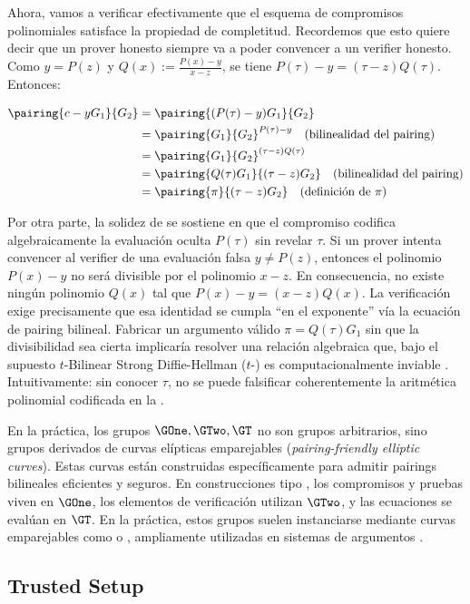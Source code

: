 Ahora, vamos a verificar efectivamente que el esquema de compromisos polinomiales \KZG satisface la propiedad de completitud. Recordemos que esto quiere decir que un prover honesto siempre va a poder convencer a un verifier honesto. Como $y = P(z)$ y $Q(x) := \frac{P(x)-y}{x-z}$, se tiene $P(\tau) - y = (\tau - z)Q(\tau)$. Entonces:

	$$\begin{aligned}
		\pairing{c - yG_1}{G_2} &= \pairing{(P(\tau) - y)G_1}{G_2} \\
	&= \pairing{G_1}{G_2}^{P(\tau) - y} \quad (\text{bilinealidad del pairing}) \\
	&= \pairing{G_1}{G_2}^{(\tau - z)Q(\tau)} \\
	&= \pairing{Q(\tau)G_1}{(\tau - z)G_2} \quad (\text{bilinealidad del pairing}) \\
	&= \pairing{\pi}{(\tau - z)G_2} \quad (\text{definición de } \pi)
\end{aligned}$$

Por otra parte, la solidez de \KZG se sostiene en que el compromiso codifica algebraicamente la evaluación oculta $P(\tau)$ sin revelar $\tau$. Si un prover intenta convencer al verifier de una evaluación falsa $y \neq P(z)$, entonces el polinomio $P(x) - y$ no será divisible por el polinomio $x - z$. En consecuencia, no existe ningún polinomio 
$Q(x)$ tal que $P(x) - y = (x - z)Q(x)$. La verificación exige precisamente que esa identidad se cumpla “en el exponente” vía la ecuación de pairing bilineal. Fabricar un argumento válido $\pi = Q(\tau) G_1$ sin que la divisibilidad sea cierta implicaría resolver una relación algebraica que, bajo el supuesto $t$-Bilinear Strong Diffie-Hellman ($t$-\BSDH) es computacionalmente inviable \cite{Kate2010}. Intuitivamente: sin conocer 
$\tau$, no se puede falsificar coherentemente la aritmética polinomial codificada en la \SRS.

En la práctica, los grupos $\GOne, \GTwo, \GT$ no son grupos arbitrarios, sino grupos derivados de curvas elípticas emparejables (\textit{pairing-friendly elliptic curves}). Estas curvas están construidas específicamente para admitir pairings bilineales eficientes y seguros. En construcciones tipo \KZG, los compromisos y pruebas viven en $\GOne$, los elementos de verificación utilizan $\GTwo$, y las ecuaciones se evalúan en $\GT$. En la práctica, estos grupos suelen instanciarse mediante curvas emparejables como \BLS o \BN, ampliamente utilizadas en sistemas de argumentos \zkSNARK.

\subsection{Trusted Setup}


